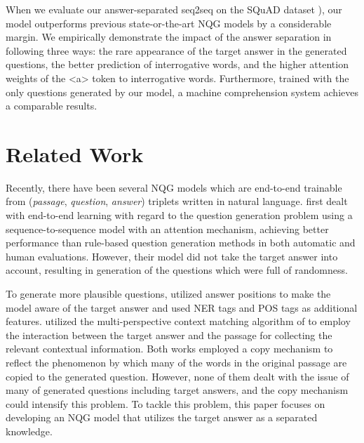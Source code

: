 \documentclass[letterpaper]{article} %
\newcommand{\kj}[1]{\textcolor{red}{#1}}
\begin{document}
When we evaluate our answer-separated seq2seq on the SQuAD dataset \cite{rajpurkar2016squad}), our model outperforms previous state-or-the-art NQG models by a considerable margin. We empirically demonstrate the impact of the answer separation in following three ways: the rare appearance of the target answer in the generated questions, the better prediction of interrogative words, and the higher attention weights of the \textless a\textgreater{} token to interrogative words. Furthermore, trained with the only questions generated by our model, a machine comprehension system achieves a comparable results.
% 
% 
% 
% 



\section{Related Work}
Recently, there have been several NQG models which are end-to-end trainable from (\textit{passage}, \textit{question}, \textit{answer}) triplets written in natural language.
\cite{du2017learning} first dealt with end-to-end learning with regard to the question generation problem using a sequence-to-sequence model with an attention mechanism, achieving better performance than rule-based question generation methods in both automatic and human evaluations. 
However, their model did not take the target answer into account, resulting in generation of the questions which were full of randomness.

To generate more plausible questions, \cite{zhou2017neural} utilized answer positions to make the model aware of the target answer and used NER tags and POS tags as additional features. 
\cite{song2018leveraging} utilized the multi-perspective context matching algorithm of \cite{wang2017bilateral} to employ the interaction between the target answer and the passage for collecting the relevant contextual information. 
Both works employed a copy mechanism \cite{gulcehre2016pointing} to reflect the phenomenon by which many of the words in the original passage are copied to the generated question. 
However, none of them dealt with the issue of many of generated questions including target answers, and the copy mechanism could intensify this problem. 
To tackle this problem, this paper focuses on developing an NQG model that utilizes the target answer as a separated knowledge.
\end{document}

